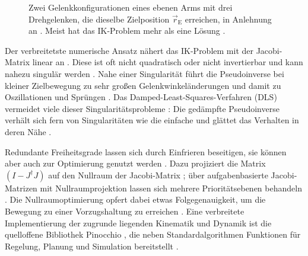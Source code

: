 \begin{figure}[htbp]
  \centering
  
  \caption[Mehrdeutigkeit der inversen Kinematik]{Zwei Gelenkkonfigurationen eines ebenen Arms mit drei Drehgelenken, die dieselbe Zielposition $\vec{r}_\mathrm{E}$ erreichen, in Anlehnung an \cite{Aristidou2009}\ev{*}. Meist hat das IK-Problem mehr als eine Lösung \cite{Aristidou2009}.}
  \label{fig:ik-mehrdeutig}
\end{figure}

Der verbreitetste numerische Ansatz nähert das IK-Problem mit der Jacobi-Matrix linear an \cite{Aristidou2009}.
Diese ist oft nicht quadratisch oder nicht invertierbar und kann nahezu singulär werden \cite{Aristidou2009}.
Nahe einer Singularität führt die Pseudoinverse bei kleiner Zielbewegung zu sehr großen Gelenkwinkeländerungen und damit zu Oszillationen und Sprüngen \cite{Aristidou2018}.
Das Damped-Least-Squares-Verfahren (DLS) vermeidet viele dieser Singularitätsprobleme \cite{Aristidou2009}: Die gedämpfte Pseudoinverse verhält sich fern von Singularitäten wie die einfache und glättet das Verhalten in deren Nähe \cite{Aristidou2009}.

Redundante Freiheitsgrade lassen sich durch Einfrieren beseitigen, sie können aber auch zur Optimierung genutzt werden \cite{DSouza2001}.
Dazu projiziert die Matrix $(I - J^{\dagger}J)$ auf den Nullraum der Jacobi-Matrix \cite{Aristidou2009}; über aufgabenbasierte Jacobi-Matrizen mit Nullraumprojektion lassen sich mehrere Prioritätsebenen behandeln \cite{Aristidou2018}.
Die Nullraumoptimierung opfert dabei etwas Folgegenauigkeit, um die Bewegung zu einer Vorzugshaltung zu erreichen \cite{DSouza2001}.
Eine verbreitete Implementierung der zugrunde liegenden Kinematik und Dynamik ist die quelloffene Bibliothek Pinocchio \cite{Carpentier2019}, die neben Standardalgorithmen Funktionen für Regelung, Planung und Simulation bereitstellt \cite{Carpentier2019}.

